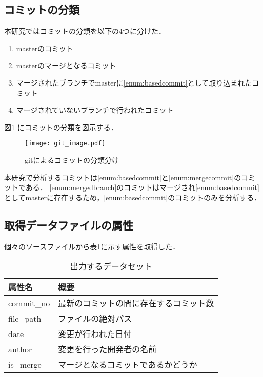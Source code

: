 \documentclass{fose2016}           %
\begin{document}
\subsection{コミットの分類}
本研究ではコミットの分類を以下の4つに分けた．

\begin{enumerate}
\item masterのコミット \label{enum:basedcommit}
\item masterのマージとなるコミット \label{enum:mergecommit}
\item マージされたブランチでmasterに\ref{enum:basedcommit}として取り込まれたコミット \label{enum:mergedbranch}
\item マージされていないブランチで行われたコミット
\end{enumerate}

図\ref{fig:gitimage} にコミットの分類を図示する．

\begin{figure}[t]
\centering
\texttt{[image: git\_image.pdf]}
\caption{gitによるコミットの分類分け}
\label{fig:gitimage} 
\end{figure}

本研究で分析するコミットは\ref{enum:basedcommit}と\ref{enum:mergecommit}のコミットである．
\ref{enum:mergedbranch}のコミットはマージされ\ref{enum:basedcommit}としてmasterに存在するため，\ref{enum:basedcommit}のコミットのみを分析する．

\subsection{取得データファイルの属性}
個々のソースファイルから表\ref{tab:初期データセット}に示す属性を取得した．

\begin{table}[htb]
\begin{center}
\caption{出力するデータセット}
\begin{tabular}{|l|l|} \hline
属性名 & 概要 \\ \hline
commit\_no & 最新のコミットの間に存在するコミット数 \\ \hline
file\_path & ファイルの絶対パス \\ \hline
date & 変更が行われた日付 \\ \hline
author & 変更を行った開発者の名前 \\ \hline
is\_merge & マージとなるコミットであるかどうか \\ \hline
\end{tabular}
\label{tab:初期データセット}
\end{center}
\end{table}
\end{document}
